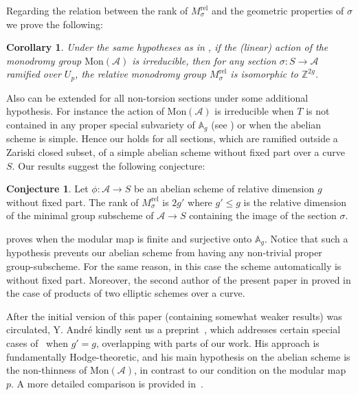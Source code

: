 \documentclass[10 pt,a4paper]{article}
\theoremstyle{plain}
\newtheorem{cor}[thm]{Corollary}
\theoremstyle{definition}
\newtheorem{conj}[thm]{Conjecture}
\theoremstyle{named}
\newcommand{\bA}{\mathbb A}
\newcommand{\cA}{\mathcal A}
\begin{document}
Regarding the relation between the rank of $M^{\textrm{rel}}_\sigma$ and the geometric properties of $\sigma$ we prove the following:
\begin{cor}\label{mainThm2}
    Under the same hypotheses as in , if the (linear) action of the monodromy group $\textrm{Mon}(\mathcal A)$ is irreducible,  then  for any section $\sigma\colon S\to \mathcal A$  ramified over $U_p$, the relative monodromy group $M_\sigma^{\textrm{rel}}$ is isomorphic to $\mathbb Z^{2g}$.
\end{cor}

Also  can be extended for all non-torsion sections under some additional hypothesis. For instance the action of $\textrm{Mon}(\cA)$ is irreducible when $T$ is not contained in any proper special subvariety of $\mathbb A_g$ (see \cite[10.2.6 Lemma]{ACZ}) or when the abelian scheme is simple. Hence our  holds for all sections, which are ramified outside a Zariski closed subset, of a simple abelian scheme without fixed part over a curve $S$. Our results suggest the following conjecture:
\begin{conj}\label{conj:main_conj}
Let  $\phi\colon \cA\to S$ be an abelian scheme of relative dimension $g$  without fixed part. The rank of $M^{\textrm{rel}}_\sigma$ is $2g'$ where $g'\le g$ is the relative dimension of the minimal group subscheme of $\cA\to S$ containing the image of the section $\sigma$.
\end{conj}

 proves  when the modular map is finite and surjective onto $\bA_g$. Notice that such a hypothesis prevents our abelian scheme from having any non-trivial proper group-subscheme. For the same reason, in this case the scheme automatically is without fixed part. Moreover, the second author of the present paper in \cite{T1} proved  in the case of products of two elliptic schemes over a curve.

After the initial version of this paper (containing somewhat weaker results) was circulated, Y. André kindly sent us a preprint~\cite{And_mon}, which addresses certain special cases of~ when \( g' = g \), overlapping with parts of our work. 
His approach is fundamentally Hodge-theoretic, and his main hypothesis on the abelian scheme is the non-thinness of \(\mathrm{Mon}(\mathcal{A})\), in contrast to our condition on the modular map \( p \). A more detailed comparison is provided in~.
\end{document}
